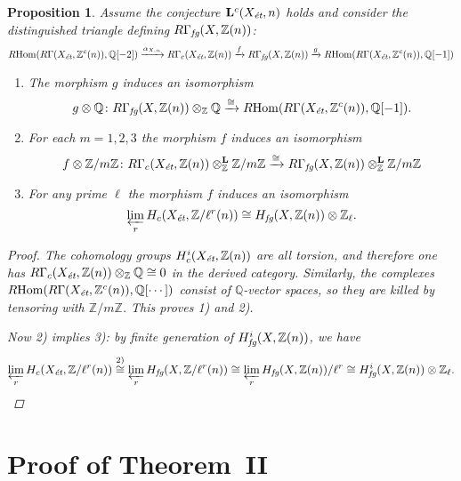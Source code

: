 \documentclass{article}
\DeclareMathOperator{\Hom}{Hom}
\newcommand{\QQ}{\mathbb{Q}}
\newcommand{\ZZ}{\mathbb{Z}}
\newcommand{\et}{\text{\it ét}}
\newcommand{\fg}{\text{\it fg}}
\newcommand{\RHom}{R\!\Hom}
\newtheorem{proposition}[theorem]{Proposition}
\theoremstyle{definition}
\numberwithin{equation}{section}
\begin{document}
\begin{proposition}
  \label{prop:tensoring-RGammafg-with-Z/m-and-Q}
  Assume the conjecture $\mathbf{L}^c (X_\et,n)$ holds and consider the
  distinguished triangle defining $R\Gamma_\fg (X, \ZZ (n))$:
  \[ \RHom (R\Gamma (X_\et, \ZZ^c (n)), \QQ [-2]) \xrightarrow{\alpha_{X,n}}
     R\Gamma_c (X_\et, \ZZ (n)) \xrightarrow{f}
     R\Gamma_\fg (X, \ZZ (n)) \xrightarrow{g}
     \RHom (R\Gamma (X_\et, \ZZ^c (n)), \QQ [-1]) \]

  \begin{enumerate}
  \item[1)] The morphism $g$ induces an isomorphism
    \[ g\otimes \QQ\colon R\Gamma_\fg (X, \ZZ (n)) \otimes_\ZZ \QQ \xrightarrow{\cong}
       \RHom (R\Gamma (X_\et, \ZZ^c (n)), \QQ [-1]).\]

  \item[2)] For each $m = 1,2,3$ the morphism $f$ induces an isomorphism
    \[ f\otimes \ZZ/m\ZZ\colon
       R\Gamma_c (X_\et, \ZZ (n))\otimes_\ZZ^\mathbf{L} \ZZ/m\ZZ \xrightarrow{\cong}
       R\Gamma_\fg (X, \ZZ (n))\otimes_\ZZ^\mathbf{L} \ZZ/m\ZZ \]
    
  \item[3)] For any prime $\ell$ the morphism $f$ induces an isomorphism
    $$\varprojlim_r H_c (X_\et, \ZZ/\ell^r (n)) \cong H_\fg (X, \ZZ (n)) \otimes \ZZ_\ell.$$
  \end{enumerate}
  
  \begin{proof}
    The cohomology groups $H_c^i (X_\et, \ZZ (n))$ are all torsion, and
    therefore one has $R\Gamma_c (X_\et, \ZZ (n)) \otimes_\ZZ \QQ \cong 0$ in
    the derived category. Similarly, the complexes
    $\RHom (R\Gamma (X_\et, \ZZ^c (n)), \QQ [\cdots])$ consist of $\QQ$-vector
    spaces, so they are killed by tensoring with $\ZZ/m\ZZ$.
    This proves 1) and 2).

    Now 2) implies 3): by finite generation of $H_\fg^i (X, \ZZ (n))$, we have
    \[ \varprojlim_r H_c (X_\et, \ZZ/\ell^r (n)) \stackrel{\text{2)}}{\cong}
      \varprojlim_r H_\fg (X, \ZZ/\ell^r (n)) \cong
      \varprojlim_r H_\fg (X, \ZZ (n))/\ell^r \cong
      H_\fg^i (X, \ZZ (n)) \otimes \ZZ_\ell. \qedhere \]
  \end{proof}
\end{proposition}


\section{Proof of Theorem~II}
\label{sec:theorem-II}
\end{document}
